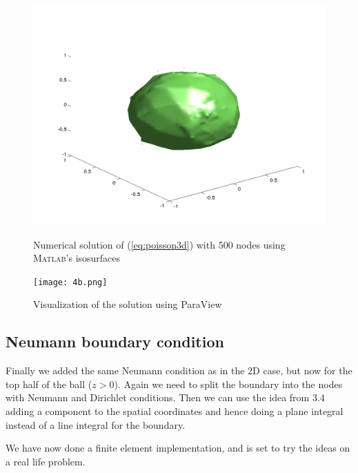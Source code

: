 \documentclass[paper=a4, fontsize=11pt]{scrartcl} %
\begin{document}
\begin{figure}[!htb]
  \includegraphics[width=\linewidth]{4b500.png}
  \caption{Numerical solution of (\ref{eq:poisson3d}) with 500 nodes using \textsc{Matlab}'s isosurfaces}\label{fig:4b500}
\endminipage\hfill
{}
  \texttt{[image: 4b.png]}
  \caption{Visualization of the solution using ParaView}\label{fig:4b}
\endminipage\hfill
\end{figure}

\subsection{Neumann boundary condition}
Finally we added the same Neumann condition as in the 2D case, but now for the top half of the ball ($z>0$). Again we need to split the boundary into the nodes with Neumann and Dirichlet conditions. Then we can use the idea from 3.4 adding a component to the spatial coordinates and hence doing a plane integral instead of a line integral for the boundary.

We have now done a finite element implementation, and is set to try the ideas on a real life problem.
\end{document}
